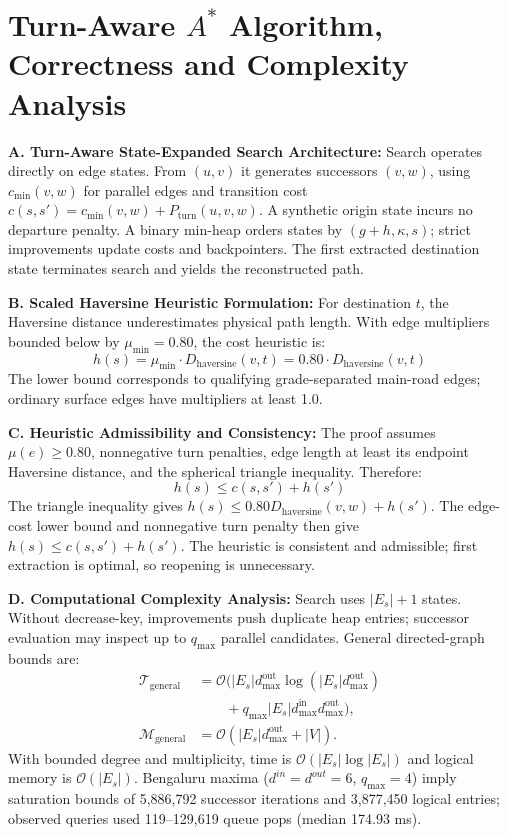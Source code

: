 \documentclass[11pt,conference]{IEEEtran}
\begin{document}
\section{Turn-Aware $A^*$ Algorithm, Correctness and Complexity Analysis}

\noindent\textbf{A. Turn-Aware State-Expanded Search Architecture:} Search operates directly on edge states. From $(u,v)$ it generates successors $(v,w)$, using $c_{\min}(v,w)$ for parallel edges and transition cost $c(s,s')=c_{\min}(v,w)+P_{\mathrm{turn}}(u,v,w)$. A synthetic origin state incurs no departure penalty. A binary min-heap orders states by $(g+h,\kappa,s)$; strict improvements update costs and backpointers. The first extracted destination state terminates search and yields the reconstructed path.

\noindent\textbf{B. Scaled Haversine Heuristic Formulation:} For destination $t$, the Haversine distance underestimates physical path length. With edge multipliers bounded below by $\mu_{\min}=0.80$, the cost heuristic is:
\begin{equation}
\label{eq:scaled_heuristic}
h(s) = \mu_{\min} \cdot D_{\text{haversine}}(v, t) = 0.80 \cdot D_{\text{haversine}}(v, t)
\end{equation}
The lower bound corresponds to qualifying grade-separated main-road edges; ordinary surface edges have multipliers at least 1.0.

\noindent\textbf{C. Heuristic Admissibility and Consistency:} The proof assumes $\mu(e)\ge0.80$, nonnegative turn penalties, edge length at least its endpoint Haversine distance, and the spherical triangle inequality. Therefore:
\begin{equation}
\label{eq:consistency_condition}
h(s) \le c(s,s') + h(s')
\end{equation}
The triangle inequality gives $h(s)\le0.80D_{\mathrm{haversine}}(v,w)+h(s')$. The edge-cost lower bound and nonnegative turn penalty then give $h(s)\le c(s,s')+h(s')$. The heuristic is consistent and admissible; first extraction is optimal, so reopening is unnecessary.

\noindent\textbf{D. Computational Complexity Analysis:} Search uses $|E_s|+1$ states. Without decrease-key, improvements push duplicate heap entries; successor evaluation may inspect up to $q_{\max}$ parallel candidates. General directed-graph bounds are:
\begin{equation}
\label{eq:complexity_bounds}
\begin{aligned}
\mathcal{T}_{\text{general}} &= \mathcal{O}\bigl(
|E_s|d_{\max}^{\text{out}}\log(|E_s|d_{\max}^{\text{out}})\\
&\qquad + q_{\max}|E_s|d_{\max}^{\text{in}}d_{\max}^{\text{out}}\bigr),\\
\mathcal{M}_{\text{general}} &= \mathcal{O}(|E_s|d_{\max}^{\text{out}}+|V|).
\end{aligned}
\end{equation}
With bounded degree and multiplicity, time is $\mathcal{O}(|E_s|\log|E_s|)$ and logical memory is $\mathcal{O}(|E_s|)$. Bengaluru maxima ($d^{in}=d^{out}=6$, $q_{\max}=4$) imply saturation bounds of 5,886,792 successor iterations and 3,877,450 logical entries; observed queries used 119--129,619 queue pops (median 174.93 ms).
\end{document}
